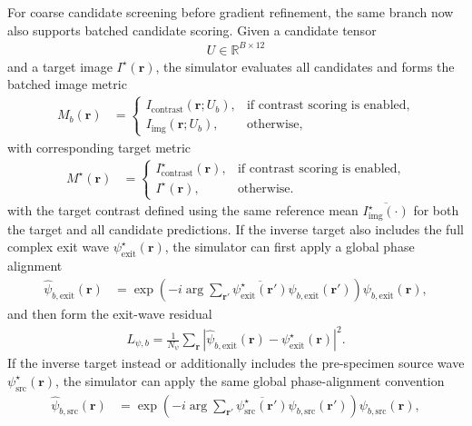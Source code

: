 \documentclass[11pt]{article}
\begin{document}
For coarse candidate screening before gradient refinement, the same branch now also
supports batched candidate scoring.  Given a candidate tensor
\begin{align}
  U \in \mathbb{R}^{B\times 12}
\end{align}
and a target image $I^\star(\mathbf{r})$, the simulator evaluates all candidates and
forms the batched image metric
\begin{align}
  M_b(\mathbf{r}) &=
  \begin{cases}
    I_{\mathrm{contrast}}(\mathbf{r}; U_b), & \text{if contrast scoring is enabled}, \\
    I_{\mathrm{img}}(\mathbf{r}; U_b), & \text{otherwise},
  \end{cases}
\end{align}
with corresponding target metric
\begin{align}
  M^\star(\mathbf{r}) &=
  \begin{cases}
    I_{\mathrm{contrast}}^\star(\mathbf{r}), & \text{if contrast scoring is enabled}, \\
    I^\star(\mathbf{r}), & \text{otherwise}.
  \end{cases}
\end{align}
with the target contrast defined using the same reference mean
\(
  \overline{I_{\mathrm{img}}^{\star}(\cdot)}
\)
for both the target and all candidate predictions.
If the inverse target also includes the full complex exit wave
\(
  \psi^\star_{\mathrm{exit}}(\mathbf{r})
\),
the simulator can first apply a global phase alignment
\begin{align}
  \widehat{\psi}_{b,\mathrm{exit}}(\mathbf{r})
  &=
  \exp\!\left(
    -i \arg \sum_{\mathbf{r}'}
    \overline{\psi^\star_{\mathrm{exit}}(\mathbf{r}')}
    \psi_{b,\mathrm{exit}}(\mathbf{r}')
  \right)
  \psi_{b,\mathrm{exit}}(\mathbf{r}),
\end{align}
and then form the exit-wave residual
\begin{align}
  L_{\psi,b}
  =
  \frac{1}{N_\psi}
  \sum_{\mathbf{r}}
  \left|
    \widehat{\psi}_{b,\mathrm{exit}}(\mathbf{r})
    -
    \psi^\star_{\mathrm{exit}}(\mathbf{r})
  \right|^2.
\end{align}
If the inverse target instead or additionally includes the pre-specimen source wave
\(
  \psi^\star_{\mathrm{src}}(\mathbf{r})
\),
the simulator can apply the same global phase-alignment convention
\begin{align}
  \widehat{\psi}_{b,\mathrm{src}}(\mathbf{r})
  &=
  \exp\!\left(
    -i \arg \sum_{\mathbf{r}'}
    \overline{\psi^\star_{\mathrm{src}}(\mathbf{r}')}
    \psi_{b,\mathrm{src}}(\mathbf{r}')
  \right)
  \psi_{b,\mathrm{src}}(\mathbf{r}),
\end{align}
\end{document}

